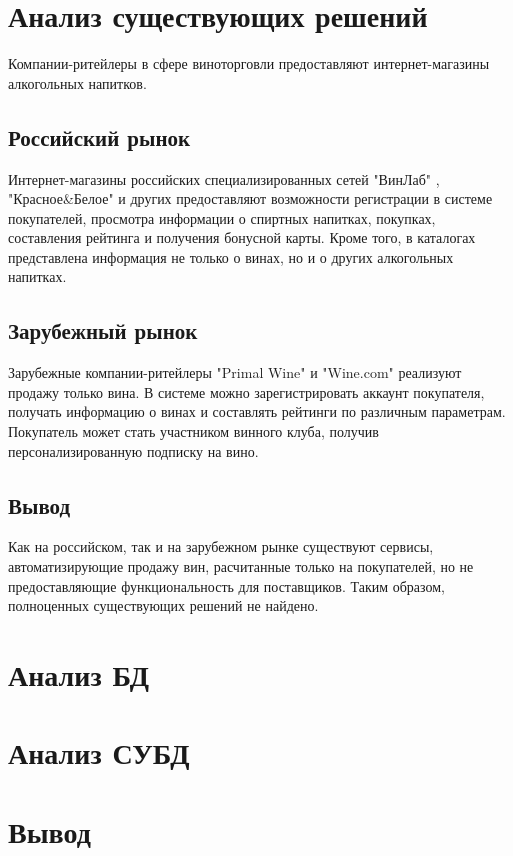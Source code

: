 \section{Анализ существующих решений}

Компании-ритейлеры в сфере виноторговли предоставляют интернет-магазины алкогольных напитков.

\subsection{Российский рынок}

Интернет-магазины российских специализированных сетей "ВинЛаб" \cite{winelab}, "Красное\&Белое" \cite{kb} и других предоставляют возможности 
регистрации в системе покупателей, просмотра информации о спиртных напитках, покупках, составления рейтинга и получения бонусной карты. Кроме того, в каталогах представлена информация не только о винах, но и о других алкогольных напитках.

\subsection{Зарубежный рынок}

Зарубежные компании-ритейлеры "Primal Wine" \cite{primal_wine} и "Wine.com" \cite{wine_com} реализуют продажу только вина. В системе можно зарегистрировать аккаунт покупателя, получать информацию о винах и составлять рейтинги по различным параметрам. Покупатель может стать участником винного клуба, получив персонализированную подписку на вино. 

\subsection{Вывод}

Как на российском, так и на зарубежном рынке существуют сервисы, автоматизирующие продажу вин, расчитанные только на покупателей, но не предоставляющие функциональность для поставщиков. Таким образом, полноценных существующих решений не найдено.

\section{Анализ БД}

\section{Анализ СУБД}

\section{Вывод}

